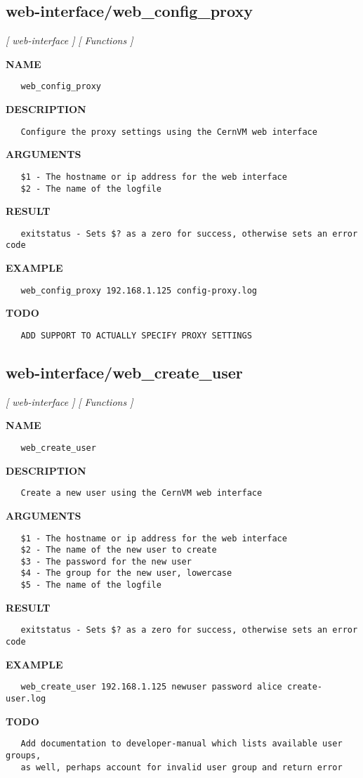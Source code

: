 \subsection{web-interface/web\_config\_proxy}
\textsl{[ web-interface ]}
\textsl{[ Functions ]}

\label{ch:robo67}
\label{ch:web_interface_web_config_proxy}
\textbf{NAME}
\begin{verbatim}
   web_config_proxy
\end{verbatim}
\textbf{DESCRIPTION}
\begin{verbatim}
   Configure the proxy settings using the CernVM web interface
\end{verbatim}
\textbf{ARGUMENTS}
\begin{verbatim}
   $1 - The hostname or ip address for the web interface
   $2 - The name of the logfile
\end{verbatim}
\textbf{RESULT}
\begin{verbatim}
   exitstatus - Sets $? as a zero for success, otherwise sets an error code
\end{verbatim}
\textbf{EXAMPLE}
\begin{verbatim}
   web_config_proxy 192.168.1.125 config-proxy.log
\end{verbatim}
\textbf{TODO}
\begin{verbatim}
   ADD SUPPORT TO ACTUALLY SPECIFY PROXY SETTINGS
\end{verbatim}
\newpage
\subsection{web-interface/web\_create\_user}
\textsl{[ web-interface ]}
\textsl{[ Functions ]}

\label{ch:robo68}
\label{ch:web_interface_web_create_user}
\textbf{NAME}
\begin{verbatim}
   web_create_user
\end{verbatim}
\textbf{DESCRIPTION}
\begin{verbatim}
   Create a new user using the CernVM web interface
\end{verbatim}
\textbf{ARGUMENTS}
\begin{verbatim}
   $1 - The hostname or ip address for the web interface
   $2 - The name of the new user to create
   $3 - The password for the new user
   $4 - The group for the new user, lowercase
   $5 - The name of the logfile
\end{verbatim}
\textbf{RESULT}
\begin{verbatim}
   exitstatus - Sets $? as a zero for success, otherwise sets an error code
\end{verbatim}
\textbf{EXAMPLE}
\begin{verbatim}
   web_create_user 192.168.1.125 newuser password alice create-user.log
\end{verbatim}
\textbf{TODO}
\begin{verbatim}
   Add documentation to developer-manual which lists available user groups,
   as well, perhaps account for invalid user group and return error
\end{verbatim}
\newpage
